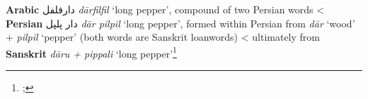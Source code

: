\begin{etymology}\label{ety:darfilfil}
\textbf{Arabic} {دارفلفل} \textit{dārfilfil} `long pepper', compound of two Persian words
< \textbf{Persian} {دار پلپل} \textit{dār pilpil} `long pepper', formed within Persian from \textit{dār} `wood' + \textit{pilpil} `pepper' (both words are Sanskrit loanwords)
< ultimately from \textbf{Sanskrit} \textit{dāru + pippali} `long pepper'\footnote{\textcite[2435]{lane_arabic-english_1863}; }
\end{etymology}